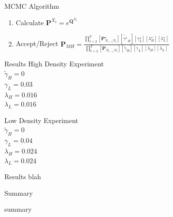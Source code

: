\documentclass[10pt]{beamer}
\begin{document}
\begin{frame}{MCMC Algorithm}
\begin{enumerate}
   \item Calculate $\mathbf{P}^{X_t} = e^{\mathbf{Q}^{X_t}} $
    
   \item Accept/Reject
    $\mathbf{P}_{MH} = \frac{\displaystyle \prod^T_{t=2} \left[\bm{P}^\star_{N_{t-1}N_t}\right] \left[ \tilde{\gamma^\star}_H \right] \left[ \gamma^\star_L \right] \left[ \lambda^\star_H \right] \left[ \lambda^\star_L \right]}
    {\displaystyle \prod^T_{t=2} \left[\bm{P}_{N_{t-1}N_t}\right] \left[ \tilde{\gamma}_H \right] \left[ \gamma_L \right] \left[ \lambda_H \right] \left[ \lambda_L \right]}$
\end{enumerate}





 \end{frame}


\begin{frame}{Results}
High Density Experiment\\
$\tilde{\gamma}_H = 0 $\\
$\gamma_L = 0.03$ \\
$\lambda_H = 0.016$ \\
$\lambda_L = 0.016$

Low Density Experiment\\
$\tilde{\gamma}_H = 0 $\\
$\gamma_L = 0.04$\\
$\lambda_H = 0.024$\\
$\lambda_L = 0.024$\\
\end{frame}

\begin{frame}{Results}
blah
\end{frame}

\begin{frame}{Summary}

  summary

\end{frame}
\end{document}
